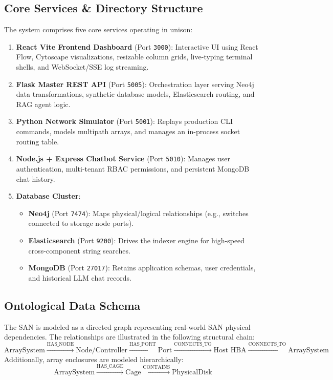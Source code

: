\documentclass[11pt,a4paper]{article}
\begin{document}
\subsection{Core Services \& Directory Structure}
The system comprises five core services operating in unison:
\begin{enumerate}
    \item \textbf{React Vite Frontend Dashboard} (Port \texttt{3000}): Interactive UI using React Flow, Cytoscape visualizations, resizable column grids, live-typing terminal shells, and WebSocket/SSE log streaming.
    \item \textbf{Flask Master REST API} (Port \texttt{5005}): Orchestration layer serving Neo4j data transformations, synthetic database models, Elasticsearch routing, and RAG agent logic.
    \item \textbf{Python Network Simulator} (Port \texttt{5001}): Replays production CLI commands, models multipath arrays, and manages an in-process socket routing table.
    \item \textbf{Node.js + Express Chatbot Service} (Port \texttt{5010}): Manages user authentication, multi-tenant RBAC permissions, and persistent MongoDB chat history.
    \item \textbf{Database Cluster}:
    \begin{itemize}
        \item \textbf{Neo4j} (Port \texttt{7474}): Maps physical/logical relationships (e.g., switches connected to storage node ports).
        \item \textbf{Elasticsearch} (Port \texttt{9200}): Drives the indexer engine for high-speed cross-component string searches.
        \item \textbf{MongoDB} (Port \texttt{27017}): Retains application schemas, user credentials, and historical LLM chat records.
    \end{itemize}
\end{enumerate}

\subsection{Ontological Data Schema}
The SAN is modeled as a directed graph representing real-world SAN physical dependencies. The relationships are illustrated in the following structural chain:
\begin{equation*}
\text{ArraySystem} \xrightarrow{\text{HAS\_NODE}} \text{Node/Controller} \xrightarrow{\text{HAS\_PORT}} \text{Port} \xrightarrow{\text{CONNECTS\_TO}} \text{Host HBA} \xrightarrow{\text{CONNECTS\_TO}} \text{ArraySystem}
\end{equation*}
Additionally, array enclosures are modeled hierarchically:
\begin{equation*}
\text{ArraySystem} \xrightarrow{\text{HAS\_CAGE}} \text{Cage} \xrightarrow{\text{CONTAINS}} \text{PhysicalDisk}
\end{equation*}
\end{document}
